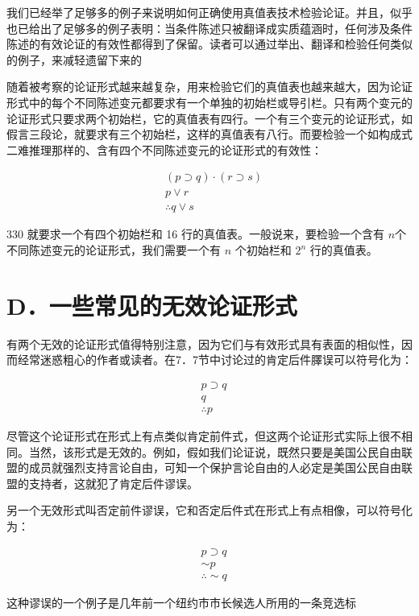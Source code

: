 我们已经举了足够多的例子来说明如何正确使用真值表技术检验论证。并且，似乎也已给出了足够多的例子表明：当条件陈述只被翻译成实质蕴涵时，任何涉及条件陈述的有效论证的有效性都得到了保留。读者可以通过举出、翻译和检验任何类似的例子，来减轻遗留下来的

随着被考察的论证形式越来越复杂，用来检验它们的真值表也越来越大，因为论证形式中的每个不同陈述变元都要求有一个单独的初始栏或导引栏。只有两个变元的论证形式只要求两个初始栏，它的真值表有四行。一个有三个变元的论证形式，如假言三段论，就要求有三个初始栏，这样的真值表有八行。而要检验一个如构成式二难推理那样的、含有四个不同陈述变元的论证形式的有效性：

$$
\begin{aligned}
& (p \supset q) \cdot(r \supset s) \\
& p \vee r \\
& \therefore q \vee s
\end{aligned}
$$

330 就要求一个有四个初始栏和 16 行的真值表。一般说来，要检验一个含有 $n$个不同陈述变元的论证形式，我们需要一个有 $n$ 个初始栏和 $2^{n}$ 行的真值表。

\section*{D．一些常见的无效论证形式}
有两个无效的论证形式值得特别注意，因为它们与有效形式具有表面的相似性，因而经常迷惑粗心的作者或读者。在7．7节中讨论过的肯定后件䐾误可以符号化为：

$$
\begin{aligned}
& p \supset q \\
& q \\
& \therefore p
\end{aligned}
$$

尽管这个论证形式在形式上有点类似肯定前件式，但这两个论证形式实际上很不相同。当然，该形式是无效的。例如，假如我们论证说，既然只要是美国公民自由联盟的成员就强烈支持言论自由，可知一个保护言论自由的人必定是美国公民自由联盟的支持者，这就犯了肯定后件谬误。

另一个无效形式叫否定前件谬误，它和否定后件式在形式上有点相像，可以符号化为：

$$
\begin{aligned}
& p \supset q \\
& \sim p \\
& \therefore \sim q
\end{aligned}
$$

这种谬误的一个例子是几年前一个纽约市市长候选人所用的一条竞选标

